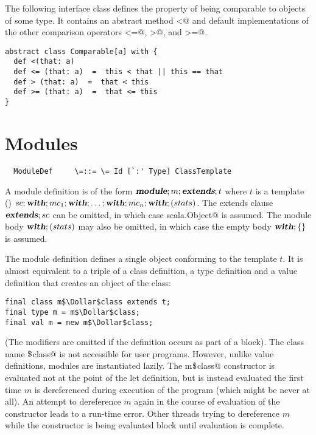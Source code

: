\documentclass[11pt]{report}
\begin{document}
\example\label{ex:comparable}
The following interface class defines the property of being
comparable to objects of some type. It contains an abstract method
\verb@<@ and default implementations of the other comparison operators
\verb@<=@, \verb@>@, and \verb@>=@.

\begin{verbatim}
abstract class Comparable[a] with {
  def <(that: a)
  def <= (that: a)  =  this < that || this == that
  def > (that: a)  =  that < this
  def >= (that: a)  =  that <= this
}
\end{verbatim}

\section{Modules}
\label{sec:modules}

\syntax\begin{verbatim}
  ModuleDef     \=::= \= Id [`:' Type] ClassTemplate
\end{verbatim}

A module definition is of the form $\mbox{\sl\bfseries module};m;\mbox{\sl\bfseries extends};t$ where $t$ is
a template ()
$sc;\mbox{\sl\bfseries with};mc_1;\mbox{\sl\bfseries with};\ldots;\mbox{\sl\bfseries with};mc_n;\mbox{\sl\bfseries with};(stats)$.  The extends
clause $\mbox{\sl\bfseries extends};sc$ can be omitted, in which case
\verb@extends scala.Object@ is assumed.
The module body $\mbox{\sl\bfseries with};(stats)$ may also be omitted, in which case the
empty body $\mbox{\sl\bfseries with};\{\}$ is assumed.

The module definition defines a single object conforming to the
template $t$.  It is almost equivalent to a triple of a class
definition,
a type definition and a value definition that creates an object of the class:
\begin{verbatim}
final class m$\Dollar$class extends t;
final type m = m$\Dollar$class;
final val m = new m$\Dollar$class;
\end{verbatim}
(The \verb@final@ modifiers are omitted if the definition occurs as
part of a block).  The class name \verb@m$\Dollar$class@ is not
accessible for user programs.
However, unlike value definitions, modules are instantiated lazily.
The \verb@new m$\Dollar$class@ constructor is evaluated not at the
point of the let definition, but is instead evaluated the first time
$m$ is dereferenced during execution of the program (which might be
never at all). An attempt to dereference $m$ again in the course of
evaluation of the constructor leads to a run-time error.  Other
threads trying to dereference $m$ while the constructor is being
evaluated block until evaluation is complete.
\end{document}
